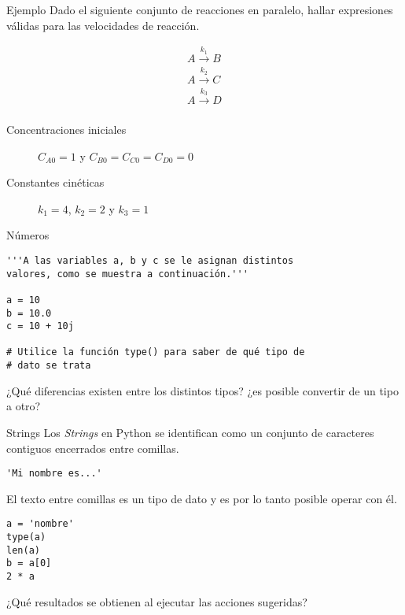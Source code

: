 \documentclass[10pt]{beamer}
\begin{document}
\begin{frame}{Ejemplo}
Dado el siguiente conjunto de reacciones en paralelo, hallar expresiones válidas para las velocidades de reacción.

$$
\begin{aligned}
A \xrightarrow{k_{1}}B\\
A \xrightarrow{k_{2}}C\\
A \xrightarrow{k_{3}}D\\
\end{aligned}
$$

\vspace{1em}

\begin{description}
	\item[Concentraciones iniciales]$C_{A0} = 1$ y $C_{B0} = C_{C0} = C_{D0} = 0$ 
	\item[Constantes cinéticas] $k_1 = 4$, $k_2 = 2$ y $ k_3 = 1$
\end{description}
\end{frame}

\begin{frame}[fragile]{Números}
\begin{verbatim}
'''A las variables a, b y c se le asignan distintos 
valores, como se muestra a continuación.'''

a = 10 
b = 10.0
c = 10 + 10j
	
# Utilice la función type() para saber de qué tipo de
# dato se trata
\end{verbatim}
\begin{center}
	¿Qué diferencias existen entre los distintos tipos? ¿es posible convertir de un tipo a otro?
\end{center}
\end{frame}

\begin{frame}[fragile]{Strings}
Los \emph{Strings} en Python se identifican como un conjunto de caracteres contiguos encerrados entre comillas.
\begin{verbatim}
'Mi nombre es...' 
\end{verbatim}
El texto entre comillas es un tipo de dato y es por lo tanto posible operar con él.
\begin{verbatim}
a = 'nombre'
type(a)
len(a)
b = a[0]
2 * a 
\end{verbatim}

\begin{center}
	¿Qué resultados se obtienen al ejecutar las acciones sugeridas?
\end{center}
\end{frame}
\end{document}
